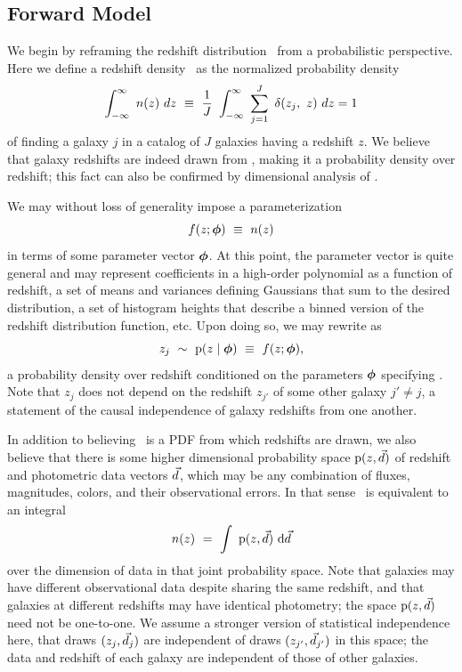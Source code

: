 \subsection{Forward Model}

We begin by reframing the redshift distribution \nz\ from a probabilistic perspective.
Here we define a redshift density \nz\ as the normalized probability density
\begin{equation}
\eqlabel{eqn:nz}
\int_{-\infty}^{\infty}\ n(z)\ dz\ \equiv\ \frac{1}{J}\ \int_{-\infty}^{\infty}\ \sum_{j=1}^{J}\ \delta(z_{j},\ z)\ dz = 1
\end{equation}
of finding a galaxy $j$ in a catalog of $J$ galaxies having a redshift $z$.
We believe that galaxy redshifts are indeed drawn from \nz, making it a probability density over redshift; this fact can also be confirmed by dimensional analysis of .

We may without loss of generality impose a parameterization
\begin{equation}
\eqlabel{eqn:fz}
f(z; \ndphi)\ \equiv\ n(z)
\end{equation}
in terms of some parameter vector ${\boldsymbol{\phi}}$.
At this point, the parameter vector is quite general and may represent coefficients in a high-order polynomial as a function of redshift, a set of means and variances defining Gaussians that sum to the desired distribution, a set of histogram heights that describe a binned version of the redshift distribution function, etc.
Upon doing so, we may rewrite  as 
\begin{equation}
\eqlabel{eqn:pz}
z_{j}\ \sim\ \pr{z \gvn \ndphi}\ \equiv\ f(z; \ndphi),
\end{equation}
a probability density over redshift conditioned on the parameters ${\boldsymbol{\phi}}$ specifying \nz.
Note that $z_{j}$ does not depend on the redshift $z_{j'}$ of some other galaxy $j' \neq j$, a statement of the causal independence of galaxy redshifts from one another.

In addition to believing \nz\ is a PDF from which redshifts are drawn, we also believe that there is some higher dimensional probability space $\mathrm{p}(z, \vec{d})$ of redshift and photometric data vectors $\vec{d}$, which may be any combination of fluxes, magnitudes, colors, and their observational errors.
In that sense \nz\ is equivalent to an integral
\begin{equation}
\eqlabel{eqn:integral}
n(z)\ =\ \integral{\pr{z, \data}}{\data}
\end{equation}
over the dimension of data in that joint probability space.
Note that galaxies may have different observational data despite sharing the same redshift, and that galaxies at different redshifts may have identical photometry; the space $\mathrm{p}(z, \vec{d})$ need not be one-to-one.
We assume a stronger version of statistical independence here, that draws $(z_{j}, \vec{d}_{j})$ are independent of draws $(z_{j'}, \vec{d}_{j'})$ in this space; the data and redshift of each galaxy are independent of those of other galaxies.

